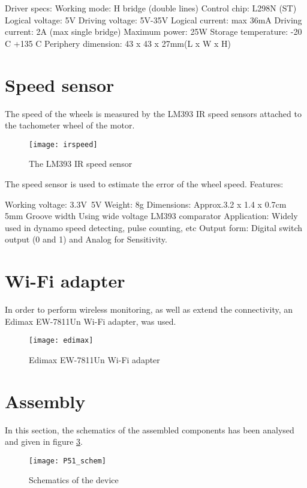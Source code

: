 Driver specs:
Working mode:	H bridge (double lines)
Control chip:	L298N (ST)
Logical voltage:	5V
Driving voltage:	5V-35V
Logical current:	max 36mA
Driving current:	2A (max single bridge)
Maximum power:	25W
Storage temperature:	-20 C +135 C
Periphery dimension:	43 x 43 x 27mm(L x W x H)

\section{Speed sensor}

The speed of the wheels is measured by the LM393 IR speed sensors attached to the tachometer wheel of the motor.\cite{SpeedSensor}

\begin{figure}[h]
\centering
\texttt{[image: irspeed]}
\caption{The LM393 IR speed sensor}
\label{fig::driver2}
\end{figure}

The speed sensor is used to estimate the error of the wheel speed.
Features:

Working voltage: 3.3V~5V
Weight: 8g
Dimensions: Approx.3.2 x 1.4 x 0.7cm
5mm Groove width
Using wide voltage LM393 comparator
Application: Widely used in dynamo speed detecting, pulse counting, etc
Output form: Digital switch output (0 and 1) and Analog for Sensitivity.


\section{Wi-Fi adapter}

In order to perform wireless monitoring, as well as extend the connectivity, an Edimax EW-7811Un Wi-Fi adapter, was used. 

\begin{figure}[h]
\centering
\texttt{[image: edimax]}
\caption{Edimax EW-7811Un Wi-Fi adapter}
\label{fig::edimax}
\end{figure}

\section{Assembly}

In this section, the schematics of the assembled components has been analysed and given in figure \ref{fig::schematics}.

\begin{figure}[h] 
\centering
\texttt{[image: P51\_schem]}
\caption{Schematics of the device}
\label{fig::schematics}
\end{figure}

